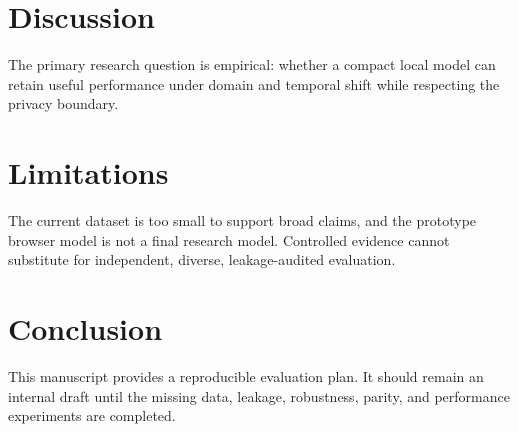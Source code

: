 \documentclass[journal]{IEEEtran}
\begin{document}
\section{Discussion}
The primary research question is empirical: whether a compact local model can retain useful performance under domain and temporal shift while respecting the privacy boundary.

\section{Limitations}
The current dataset is too small to support broad claims, and the prototype browser model is not a final research model. Controlled evidence cannot substitute for independent, diverse, leakage-audited evaluation.

\section{Conclusion}
This manuscript provides a reproducible evaluation plan. It should remain an internal draft until the missing data, leakage, robustness, parity, and performance experiments are completed.



\end{document}
